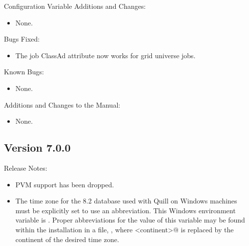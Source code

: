 \noindent Configuration Variable Additions and Changes:

\begin{itemize}

\item None.

\end{itemize}

\noindent Bugs Fixed:

\begin{itemize}

\item The job ClassAd attribute  now works 
for grid universe jobs.

\end{itemize}

\noindent Known Bugs:

\begin{itemize}

\item None.

\end{itemize}

\noindent Additions and Changes to the Manual:

\begin{itemize}

\item None.

\end{itemize}


\subsection*{\label{sec:New-7-0-0}Version 7.0.0}

\noindent Release Notes:

\begin{itemize}

\item PVM support has been dropped.

\item The time zone for the  8.2 database
  used with Quill on Windows machines must be explicitly set
  to use an abbreviation.
  This Windows environment variable is \verb@TZ@.
  Proper abbreviations for the value of this variable may be found
  within the  installation in a file,
  , where
  \verb@<continent>@ is replaced by the continent of the 
  desired time zone.

\end{itemize}


